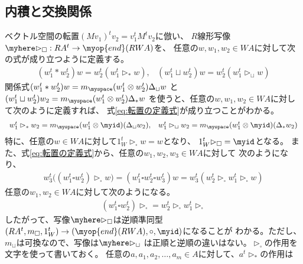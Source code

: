 	\subsection{内積と交換関係}\label{s2:内積と交換関係} %
		ベクトル空間の転置$(Mv_1)^tv_2=v_1^tM^tv_2$に倣い、
		$R$線形写像$\myhere\rhd_\square:RA^t\to \myop{end}(RWA)$を、
		任意の$w,w_1,w_2\in WA$に対して次の式が成り立つように定義する。
		\begin{equation}\label{eq:転置の定義式}\begin{array}{cc} %
			(w_1^t* w_2^t)w = w_2^t(w_1^t\rhd_* w)
				, & (w_1^t\sqcup w_2^t)w = w_2^t(w_1^t\rhd_\sqcup w)
		\end{array}\end{equation} %
		関係式$(w_1^t* w_2^t)w=m_\myspace(w_1^t\otimes w_2^t)\Delta_\sqcup w$
		と$(w_1^t\sqcup w_2^t)w_2=m_\myspace(w_1^t\otimes w_2^t)\Delta_*w$
		を使うと、任意の$w,w_1,w_2\in WA$に対して次のように定義すれば、
		式\eqref{eq:転置の定義式}が成り立つことがわかる。
		\begin{equation*}\begin{array}{cc} %
			w_1^t\rhd_* w_2 = m_\myspace(w_1^t\otimes \myid)(\Delta_\sqcup w_2)
			, & w_1^t\rhd_\sqcup w_2 = m_\myspace(w_1^t\otimes \myid)(\Delta_* w_2)
		\end{array}\end{equation*} %
		特に、任意の$w\in WA$に対して$1_W^t\rhd_\square w=w$となり、
		$1_W^t\rhd_\square=\myid$となる。
		また、式\eqref{eq:転置の定義式}から、任意の$w_1,w_2,w_3\in WA$に対して
		次のようになり、
		\begin{equation*}\begin{split} %
			w_3^t\bigl((w_1^t\square w_2^t)\rhd_\square w\bigr)
			= (w_1^t\square w_2^t\square w_3^t)w 
			= w_3^t(w_2^t\rhd_\square w_1^t\rhd_\square w)
		\end{split}\end{equation*} %
		任意の$w_1,w_2\in WA$に対して次のようになる。
		\begin{equation*}\begin{split} %
			(w_1^t\square w_2^t)\rhd_\square = w_2^t\rhd_\square w_1^t\rhd_\square
		\end{split}\end{equation*} %
		したがって、写像$\myhere\rhd_\square$は逆順準同型
		$(RA^t,m_\square,1_W^t)\to(\myop{end}(RWA),\circ,\myid)$になることが
		わかる。ただし、$m_\sqcup$は可換なので、写像は$\myhere\rhd_\sqcup$
		は正順と逆順の違いはない。$\rhd_\square$の作用を文字を使って書いておく。
		任意の$a,a_1,a_2,\dots,a_m\in A$に対して、$a^t\rhd_*$の作用は
